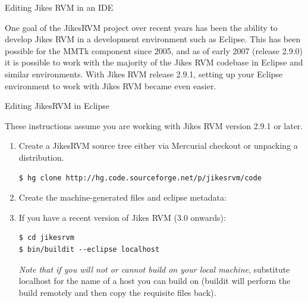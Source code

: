 \begin{section}{Editing Jikes RVM in an IDE}
\label{sec:editingjikesrvminanide}

One goal of the JikesRVM project over recent years has been the ability to develop Jikes RVM in a development environment such as Eclipse. This has been possible for the MMTk component since 2005, and as of early 2007 (release 2.9.0) it is possible to work with the majority of the Jikes RVM codebase in Eclipse and similar environments.  With Jikes RVM release 2.9.1, setting up your Eclipse environment to work with Jikes RVM became even easier.

\begin{subsection}{Editing JikesRVM in Eclipse}

These instructions assume you are working with Jikes RVM version 2.9.1 or later.

\begin{enumerate}
  \item Create a JikesRVM source tree either via Mercurial checkout or unpacking a distribution.
     \begin{lstlisting}
$ hg clone http://hg.code.sourceforge.net/p/jikesrvm/code
     \end{lstlisting}
  \item Create the machine-generated files and eclipse metadata:
     \item If you have a recent version of Jikes RVM (3.0 onwards):
       \begin{lstlisting}
$ cd jikesrvm
$ bin/buildit --eclipse localhost
       \end{lstlisting}
        \textit{Note that if you will not or cannot build on your local machine}, substitute localhost for the name of a host you can build on (buildit will perform the build remotely and then copy the requisite files back).


\end{enumerate}
\end{subsection}
\end{section}

